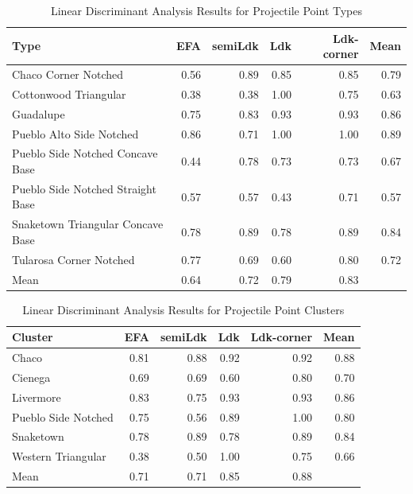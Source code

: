 \documentclass[letterpaper]{article}
\begin{document}
\begin{table}

\caption{\label{tab:LDAResultsType}Linear Discriminant Analysis Results for Projectile Point Types}
\centering
\begin{tabular}[t]{lrrrrr}
\toprule
Type & EFA & semiLdk & Ldk & Ldk-corner & Mean\\
\midrule
Chaco Corner Notched & 0.56 & 0.89 & 0.85 & 0.85 & 0.79\\
Cottonwood Triangular & 0.38 & 0.38 & 1.00 & 0.75 & 0.63\\
Guadalupe & 0.75 & 0.83 & 0.93 & 0.93 & 0.86\\
Pueblo Alto Side Notched & 0.86 & 0.71 & 1.00 & 1.00 & 0.89\\
Pueblo Side Notched Concave Base & 0.44 & 0.78 & 0.73 & 0.73 & 0.67\\
\addlinespace
Pueblo Side Notched Straight Base & 0.57 & 0.57 & 0.43 & 0.71 & 0.57\\
Snaketown Triangular Concave Base & 0.78 & 0.89 & 0.78 & 0.89 & 0.84\\
Tularosa Corner Notched & 0.77 & 0.69 & 0.60 & 0.80 & 0.72\\
Mean & 0.64 & 0.72 & 0.79 & 0.83 & \\
\bottomrule
\end{tabular}
\end{table}

\begin{table}

\caption{\label{tab:LDAResultsCluster}Linear Discriminant Analysis Results for Projectile Point Clusters}
\centering
\begin{tabular}[t]{lrrrrr}
\toprule
Cluster & EFA & semiLdk & Ldk & Ldk-corner & Mean\\
\midrule
Chaco & 0.81 & 0.88 & 0.92 & 0.92 & 0.88\\
Cienega & 0.69 & 0.69 & 0.60 & 0.80 & 0.70\\
Livermore & 0.83 & 0.75 & 0.93 & 0.93 & 0.86\\
Pueblo Side Notched & 0.75 & 0.56 & 0.89 & 1.00 & 0.80\\
Snaketown & 0.78 & 0.89 & 0.78 & 0.89 & 0.84\\
\addlinespace
Western Triangular & 0.38 & 0.50 & 1.00 & 0.75 & 0.66\\
Mean & 0.71 & 0.71 & 0.85 & 0.88 & \\
\bottomrule
\end{tabular}
\end{table}
\end{document}
